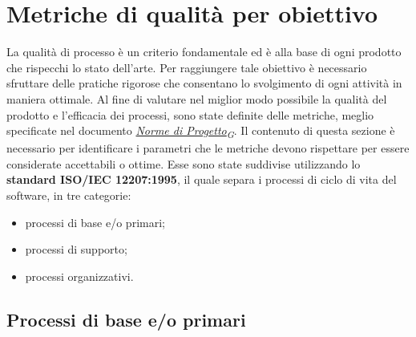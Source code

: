 \section{Metriche di qualità per obiettivo}
La qualità di processo è un criterio fondamentale ed è alla base di ogni prodotto che rispecchi lo stato dell'arte. Per raggiungere tale obiettivo è necessario sfruttare delle pratiche rigorose che consentano lo svolgimento di ogni attività in maniera ottimale. Al fine di valutare nel miglior modo possibile la qualità del prodotto e l'efficacia dei processi, sono state definite delle metriche, meglio specificate nel documento \href{https://7last.github.io/docs/rtb/documentazione-interna/glossario#norme-di-progetto}{\textit{Norme di Progetto\textsubscript{G}}}. Il contenuto di questa sezione è necessario per identificare i parametri che le metriche devono rispettare per essere considerate accettabili o ottime. Esse sono state suddivise utilizzando lo \textbf{standard ISO/IEC 12207:1995}, il quale separa i processi di ciclo di vita del software, in tre categorie: %
\begin{itemize}
	\item processi di base e/o primari;
	\item processi di supporto;
	\item processi organizzativi.
\end{itemize}

\subsection{Processi di base e/o primari}
